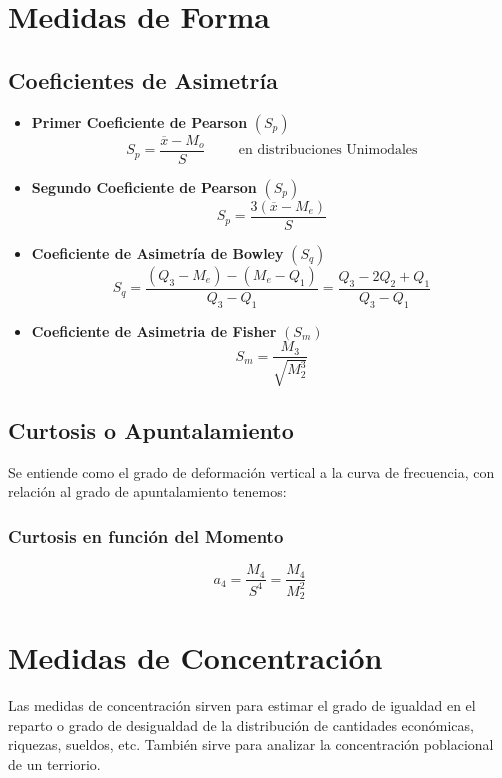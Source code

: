 \section{Medidas de Forma}
\subsection{Coeficientes de Asimetría}
\begin{itemize}
\item \textbf{Primer Coeficiente de Pearson} $(S_p)$
$$S_p=\dfrac{\overline{x}-M_o}{S} \hspace{1cm} \textrm{en distribuciones Unimodales}$$
\item \textbf{Segundo Coeficiente de Pearson} $(S_p)$
$$S_p=\dfrac{3(\overline{x}-M_e)}{S}$$
\item \textbf{Coeficiente de Asimetría de Bowley} $(S_q)$
$$S_q=\dfrac{(Q_3-M_e)-(M_e-Q_1)}{Q_3-Q_1}=\dfrac{Q_3-2Q_2+Q_1}{Q_3-Q_1}$$
\item \textbf{Coeficiente de Asimetria de Fisher} $(S_m)$
$$S_m = \dfrac{M_3}{\sqrt{M_2^3}}$$
\end{itemize}
\subsection{Curtosis o Apuntalamiento}
Se entiende como el grado de deformación vertical a la curva de frecuencia, con relación al grado de apuntalamiento tenemos:
\begin{center}
\end{center}
\subsubsection{Curtosis en función del Momento}
$$a_4=\dfrac{M_4}{S^4}=\dfrac{M_4}{M_2^2}$$
\section{Medidas de Concentración}
Las medidas de concentración sirven para estimar el grado de igualdad en el reparto o grado de desigualdad de la distribución de cantidades económicas, riquezas, sueldos, etc. También sirve para analizar la concentración poblacional de un terriorio.
